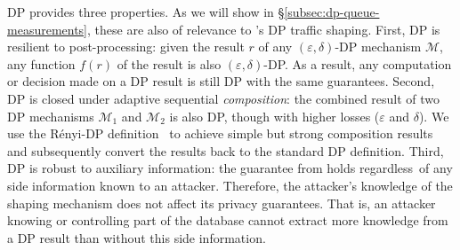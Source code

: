 DP provides three properties.
As we will show in \S\ref{subsec:dp-queue-measurements}, these are also of
relevance to {\sys}'s DP traffic shaping.
First, DP is resilient to post-processing: given the result $r$ of any
$(\varepsilon, \delta)$-DP mechanism $\mathcal{M}$, any function $f(r)$
of the result is also $(\varepsilon, \delta)$-DP.
As a result, any computation or decision made on a DP result is still DP with
the same guarantees.
Second, DP is closed under adaptive sequential {\em composition}: the combined
result of two DP mechanisms $\mathcal{M}_1$ and $\mathcal{M}_2$ is also DP,
though with higher losses ($\varepsilon$ and $\delta$).
We use the R\'enyi-DP definition~\cite{mironov2017renyi} to achieve simple but
strong composition results and subsequently convert the results
back to the standard DP definition.
%
Third, DP is robust to auxiliary information: the guarantee from 
holds regardless~of any side information known to an attacker.
Therefore, the attacker's knowledge of the shaping mechanism does not affect its
privacy guarantees.
That is, an attacker knowing or controlling part of the database cannot extract
more knowledge from a DP result than without this side information.

